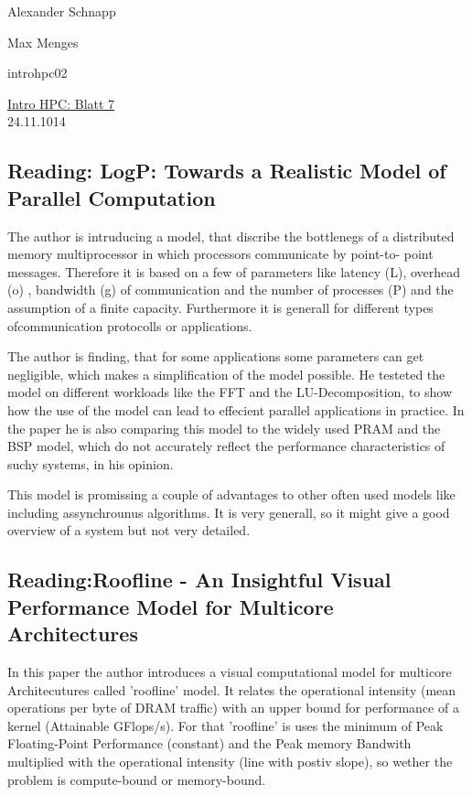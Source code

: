 \documentclass[a4paper,11pt]{scrartcl}
\begin{document}
\hfill Alexander Schnapp

\hfill Max Menges

\hfill introhpc02

\begin{center}
\underline{\Huge{Intro HPC: Blatt 7}}\\
\large{24.11.1014}\\
\end{center}


\subsection{Reading: LogP: Towards a Realistic Model of Parallel Computation}
The author is intruducing a model, that
discribe the bottlenegs of a distributed memory
multiprocessor in which processors communicate by point-to-
point messages.
Therefore it is based on a few of parameters like latency (L), overhead (o) , bandwidth (g) of communication and the number of processes (P) and the assumption of a finite capacity.
Furthermore it is generall for different types ofcommunication protocolls or applications. 

The author is finding, that for some applications some parameters can get negligible, which makes a simplification of the model possible. He testeted the model on different workloads like the FFT and the LU-Decomposition, to show how the use of the model can lead to effecient parallel applications in practice.
In the paper he is also comparing this model to the widely used PRAM and the BSP model, which do not
accurately reflect the performance characteristics of suchy systems, in his opinion.

This model is promissing a couple of advantages to other often used models like including assynchrounus algorithms. It is 
 very generall, so it might give a good overview of a system but not very detailed.
 
 \subsection{Reading:Roofline - An Insightful
Visual
Performance
Model for
Multicore
Architectures}

In this paper the author introduces a visual computational model for multicore Architecutures called 'roofline' model.
It relates the operational intensity (mean operations per byte
of DRAM traffic) with an upper bound for performance of
a kernel (Attainable GFlops/s). For that 'roofline' is uses the minimum of Peak Floating-Point Performance (constant) and the Peak memory Bandwith multiplied with the operational intensity (line with postiv slope), so wether the problem is compute-bound or memory-bound.
\end{document}
